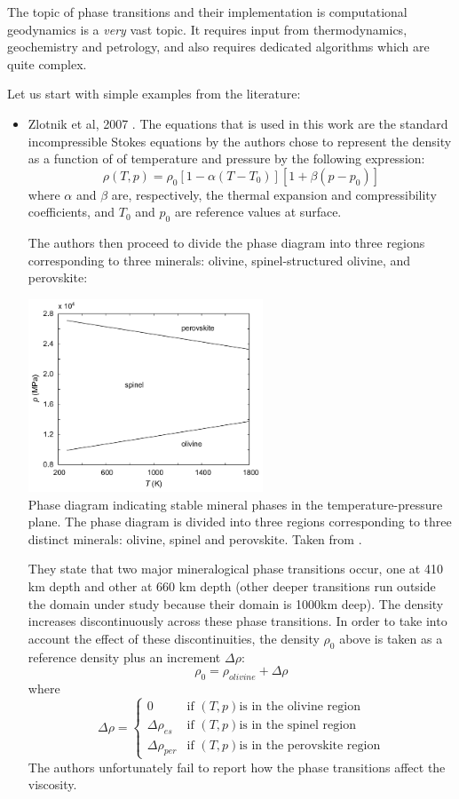 
The topic of phase transitions and their implementation is computational geodynamics is a 
{\sl very} vast topic. It requires input from thermodynamics, geochemistry and petrology, and also requires 
dedicated algorithms which are quite complex.

Let us start with simple examples from the literature:

\begin{itemize}
\item Zlotnik et al, 2007 \cite{zldf07}. The equations that is used in this work are the 
standard incompressible Stokes equations by the authors chose to represent the 
density as a function of of temperature and pressure by the following expression:
\[
\rho(T,p)=\rho_0[1-\alpha(T-T_0)][1+\beta(p-p_0)]
\]
where $\alpha$ and $\beta$ are, respectively, the thermal expansion and
compressibility coefficients, and $T_0$ and $p_0$ are reference values at surface.

The authors then proceed to divide the phase diagram into three regions corresponding 
to three minerals: olivine, spinel-structured olivine, and perovskite:

\begin{center}
\includegraphics[width=7cm]{images/phasetransitions/zldf07}\\
{\captionfont Phase diagram indicating stable mineral phases in the 
temperature-pressure plane. The phase diagram is divided into three regions
corresponding to three distinct minerals: olivine, spinel and perovskite.
Taken from \cite{zldf07}.}
\end{center}

They state that two major mineralogical phase transitions occur, one at
410 km depth and other at 660 km depth (other deeper transitions run outside the 
domain under study because their domain is 1000km deep). The density increases 
discontinuously across these phase transitions. 
In order to take into account the effect of these 
discontinuities, the density $\rho_0$ above is taken as a reference density plus an 
increment $\Delta \rho$:
\[
\rho_0 = \rho_{olivine} + \Delta \rho
\]
where 
\[
\Delta \rho
=
\left\{
\begin{array}{lll}
0 & \text{if } (T,p) \text{is in the olivine region} \\
\Delta \rho_{es} & \text{if } (T,p) \text{is in the spinel region} \\
\Delta \rho_{per} & \text{if } (T,p) \text{is in the perovskite region} 
\end{array}
\right.
\]
The authors unfortunately fail to report how the phase transitions affect the viscosity.


\end{itemize}
